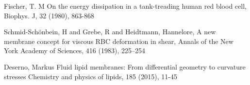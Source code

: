 \begin{thebibliography}{10}

    Fischer, T. M
    On the energy dissipation in a tank-treading human red blood cell,
    Biophys. J, 32 (1980), 863-868
    
  Schmid-Sch{\"o}nbein, H and Grebe, R and Heidtmann, Hannelore,
  A new membrane concept for viscous RBC deformation in shear,
  Annals of the New York Academy of Sciences, 416 (1983), 225--254
  
  Deserno, Markus
  Fluid lipid membranes: From differential geometry to curvature stresses
  Chemistry and physics of lipids, 185 (2015), 11-45
  
\end{thebibliography}

